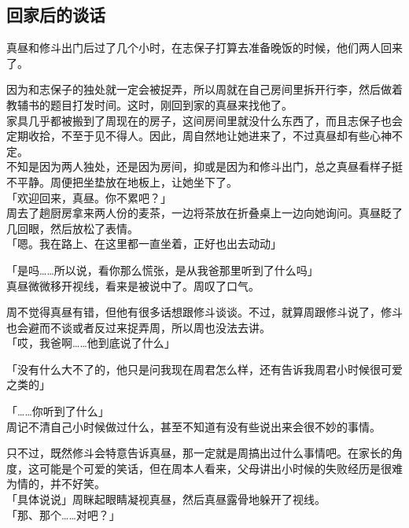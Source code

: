 \subsection{回家后的谈话}

真昼和修斗出门后过了几个小时，在志保子打算去准备晚饭的时候，他们两人回来了。

因为和志保子的独处就一定会被捉弄，所以周就在自己房间里拆开行李，然后做着教辅书的题目打发时间。这时，刚回到家的真昼来找他了。\\

家具几乎都被搬到了周现在的房子，这间房间里就没什么东西了，而且志保子也会定期收拾，不至于见不得人。因此，周自然地让她进来了，不过真昼却有些心神不定。\\

不知是因为两人独处，还是因为房间，抑或是因为和修斗出门，总之真昼看样子挺不平静。周便把坐垫放在地板上，让她坐下了。\\

「欢迎回来，真昼。你不累吧？」\\

周去了趟厨房拿来两人份的麦茶，一边将茶放在折叠桌上一边向她询问。真昼眨了几回眼，然后放松了表情。\\

「嗯。我在路上、在这里都一直坐着，正好也出去动动」

「是吗……所以说，看你那么慌张，是从我爸那里听到了什么吗」\\

真昼微微移开视线，看来是被说中了。周叹了口气。

周不觉得真昼有错，但他有很多话想跟修斗谈谈。不过，就算周跟修斗说了，修斗也会避而不谈或者反过来捉弄周，所以周也没法去讲。\\

「哎，我爸啊……他到底说了什么」

「没有什么大不了的，他只是问我现在周君怎么样，还有告诉我周君小时候很可爱之类的」

「……你听到了什么」\\

周记不清自己小时候做过什么，甚至不知道有没有些说出来会很不妙的事情。

只不过，既然修斗会特意告诉真昼，那一定就是周搞出过什么事情吧。在家长的角度，这可能是个可爱的笑话，但在周本人看来，父母讲出小时候的失败经历是很难为情的，并不好笑。\\

「具体说说」周眯起眼睛凝视真昼，然后真昼露骨地躲开了视线。\\

「那、那个……对吧？」

